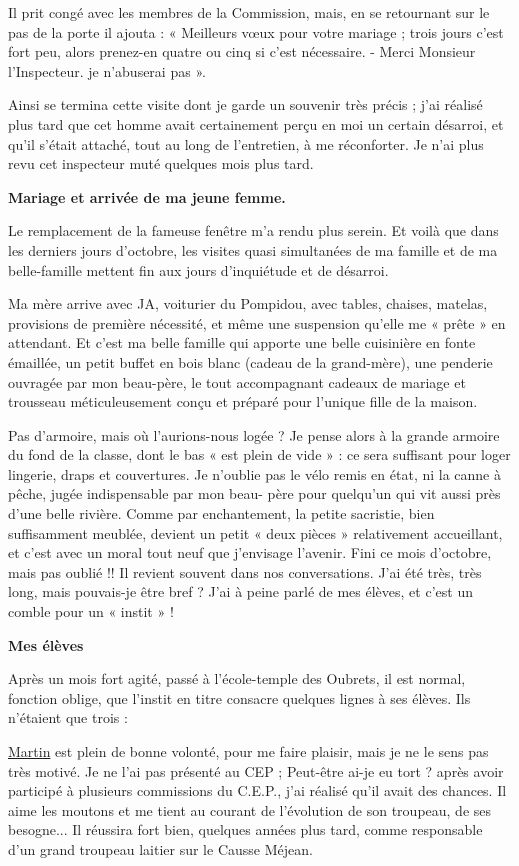 
Il prit congé avec les membres de la Commission, mais, en se retournant sur le pas de la porte
il ajouta :
« Meilleurs vœux pour votre mariage ; trois jours c’est fort peu, alors prenez-en quatre ou
cinq si c’est nécessaire.
- Merci Monsieur l’Inspecteur. je n’abuserai pas ».

Ainsi se termina cette visite dont je garde un souvenir très précis ; j’ai réalisé plus tard que cet
homme avait certainement perçu en moi un certain désarroi, et qu’il s’était attaché, tout au
long de l’entretien, à me réconforter. Je n’ai plus revu cet inspecteur muté quelques mois plus
tard.

\textbf{Mariage et arrivée de ma jeune femme.}

Le remplacement de la fameuse fenêtre m’a rendu plus serein. Et voilà que dans les derniers
jours d’octobre, les visites quasi simultanées de ma famille et de ma belle-famille mettent fin
aux jours d’inquiétude et de désarroi.

Ma mère arrive avec JA, voiturier du Pompidou, avec tables, chaises, matelas, provisions de
première nécessité, et même une suspension qu’elle me « prête » en attendant. Et c’est ma
belle famille qui apporte une belle cuisinière en fonte émaillée, un petit buffet en bois blanc
(cadeau de la grand-mère), une penderie ouvragée par mon beau-père, le tout accompagnant
cadeaux de mariage et trousseau méticuleusement conçu et préparé pour l’unique fille de la
maison.

Pas d’armoire, mais où l’aurions-nous logée ? Je pense alors à la grande armoire du fond de la
classe, dont le bas « est plein de vide » : ce sera suffisant pour loger lingerie, draps et
couvertures.
Je n’oublie pas le vélo remis en état, ni la canne à pêche, jugée indispensable par mon beau-
père pour quelqu’un qui vit aussi près d’une belle rivière.
Comme par enchantement, la petite sacristie, bien suffisamment meublée, devient un petit
« deux pièces » relativement accueillant, et c’est avec un moral tout neuf que j’envisage
l’avenir.
Fini ce mois d’octobre, mais pas oublié !! Il revient souvent dans nos conversations. J’ai été
très, très long, mais pouvais-je être bref ? J’ai à peine parlé de mes élèves, et c’est un comble
pour un « instit » !

\textbf{Mes élèves}

Après un mois fort agité, passé à l’école-temple des Oubrets, il est normal, fonction oblige,
que l’instit en titre consacre quelques lignes à ses élèves. Ils n’étaient que trois :

\underline{Martin} est plein de bonne volonté, pour me faire plaisir, mais je ne le sens pas très motivé. Je
ne l’ai pas présenté au CEP ; Peut-être ai-je eu tort ? après avoir participé à plusieurs
commissions du C.E.P., j’ai réalisé qu’il avait des chances. Il aime les moutons et me tient au
courant de l’évolution de son troupeau, de ses besogne... Il réussira fort bien, quelques années
plus tard, comme responsable d’un grand troupeau laitier sur le Causse Méjean.
